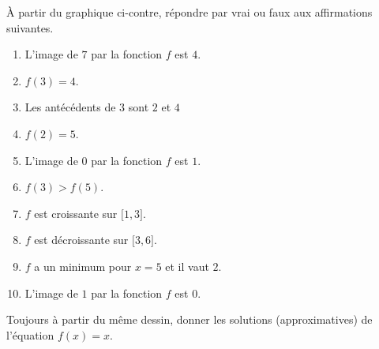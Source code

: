 
\begin{exercice}\label{exoSeconde-0069}

    \begin{multicols}{2}

À partir du graphique ci-contre, répondre par vrai ou faux aux affirmations suivantes.

\begin{enumerate}
   \item
       L'image de \( 7\) par la fonction \( f\) est \( 4\).
   \item
       \( f(3)=4\).
   \item
       Les antécédents de \( 3\) sont \( 2\) et \( 4\)
   \item
       \( f(2)=5\).
   \item
       L'image de \( 0\) par la fonction \( f\) est \( 1\).
   \item
       \( f(3)>f(5)\).
   \item
       \( f\) est croissante sur \( \mathopen[ 1 , 3 \mathclose]\).
   \item
       \( f\) est décroissante sur \( \mathopen[ 3 , 6 \mathclose]\).
    \item
        \( f\) a un minimum pour \( x=5\) et il vaut \( 2\).
    \item
       L'image de \( 1\) par la fonction \( f\) est \( 0\).
\end{enumerate}

\columnbreak



    \end{multicols}

Toujours à partir du même dessin, donner les solutions (approximatives) de l'équation \( f(x)=x\).


\end{exercice}
